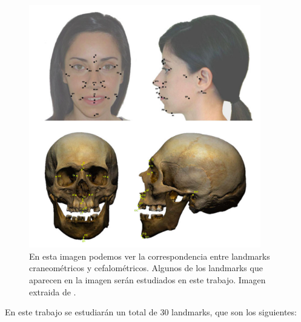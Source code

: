 \begin{figure}[!h]
    \centering
    \includegraphics[width=0.9\textwidth]{img/marcado_landmarks.png}
    \caption{En esta imagen podemos ver la correspondencia entre landmarks craneométricos y cefalométricos. Algunos de los landmarks que aparecen en la imagen serán estudiados en este trabajo. Imagen extraida de \cite{damas2020handbook}.}
\end{figure}


\newpage

\noindent En este trabajo se estudiarán un total de $30$ landmarks, que son los siguientes: 

